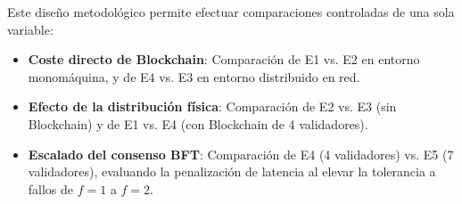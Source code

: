 \begin{table}[H]
\centering
\caption{Matriz de configuraciones experimentales evaluadas.}
\label{tab:configuraciones}
\end{table}

Este diseño metodológico permite efectuar comparaciones controladas de una sola variable:
\begin{itemize}
    \item \textbf{Coste directo de Blockchain}: Comparación de E1 vs. E2 en entorno monomáquina, y de E4 vs. E3 en entorno distribuido en red.
    \item \textbf{Efecto de la distribución física}: Comparación de E2 vs. E3 (sin Blockchain) y de E1 vs. E4 (con Blockchain de 4 validadores).
    \item \textbf{Escalado del consenso BFT}: Comparación de E4 (4 validadores) vs. E5 (7 validadores), evaluando la penalización de latencia al elevar la tolerancia a fallos de $f=1$ a $f=2$.
\end{itemize}

